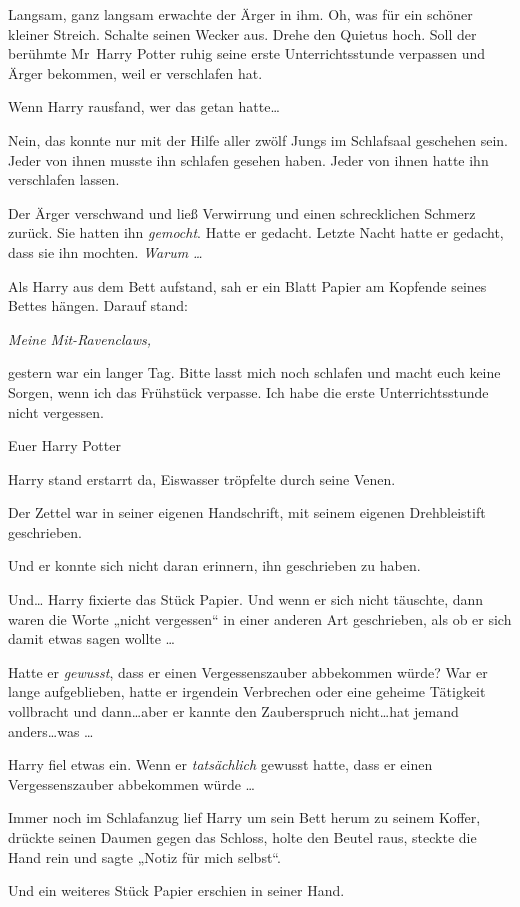 {Langsam, ganz langsam erwachte der Ärger in ihm. Oh, was für ein schöner kleiner Streich. Schalte seinen Wecker aus. Drehe den Quietus hoch. Soll der berühmte Mr~Harry Potter ruhig seine erste Unterrichtsstunde verpassen und Ärger bekommen, weil er verschlafen hat.

Wenn Harry rausfand, wer das getan hatte…

Nein, das konnte nur mit der Hilfe aller zwölf Jungs im Schlafsaal geschehen sein. Jeder von ihnen musste ihn schlafen gesehen haben. Jeder von ihnen hatte ihn verschlafen lassen.

Der Ärger verschwand und ließ Verwirrung und einen schrecklichen Schmerz zurück. Sie hatten ihn \emph{gemocht}. Hatte er gedacht. Letzte Nacht hatte er gedacht, dass sie ihn mochten. \emph{Warum …}

Als Harry aus dem Bett aufstand, sah er ein Blatt Papier am Kopfende seines Bettes hängen. Darauf stand:

\emph{Meine Mit-Ravenclaws,}

gestern war ein langer Tag. Bitte lasst mich noch schlafen und macht euch keine Sorgen, wenn ich das Frühstück verpasse. Ich habe die erste Unterrichtsstunde nicht vergessen.

Euer Harry Potter

Harry stand erstarrt da, Eiswasser tröpfelte durch seine Venen.

Der Zettel war in seiner eigenen Handschrift, mit seinem eigenen Drehbleistift geschrieben.

Und er konnte sich nicht daran erinnern, ihn geschrieben zu haben.

Und… Harry fixierte das Stück Papier. Und wenn er sich nicht täuschte, dann waren die Worte „nicht vergessen“ in einer anderen Art geschrieben, als ob er sich damit etwas sagen wollte …

Hatte er \emph{gewusst}, dass er einen Vergessenszauber abbekommen würde? War er lange aufgeblieben, hatte er irgendein Verbrechen oder eine geheime Tätigkeit vollbracht und dann…aber er kannte den Zauberspruch nicht…hat jemand anders…was …

Harry fiel etwas ein. Wenn er \emph{tatsächlich} gewusst hatte, dass er einen Vergessenszauber abbekommen würde …

Immer noch im Schlafanzug lief Harry um sein Bett herum zu seinem Koffer, drückte seinen Daumen gegen das Schloss, holte den Beutel raus, steckte die Hand rein und sagte „Notiz für mich selbst“.

Und ein weiteres Stück Papier erschien in seiner Hand.

}

